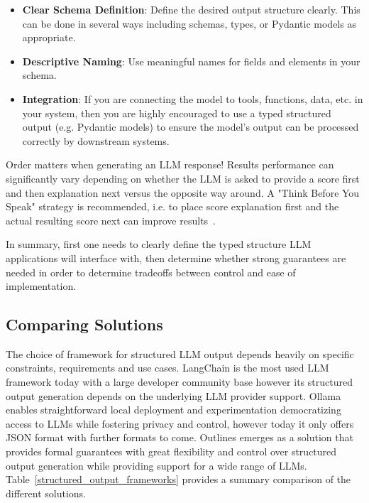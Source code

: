 \begin{itemize}
    \item \textbf{Clear Schema Definition}: Define the desired output structure clearly. This can be done in several ways including schemas, types, or Pydantic models as appropriate.
    
    \item \textbf{Descriptive Naming}: Use meaningful names for fields and elements in your schema.
    
    \item \textbf{Integration}: If you are connecting the model to tools, functions, data, etc. in your system, then you are highly encouraged to use a typed structured output (e.g. Pydantic models) to ensure the model's output can be processed correctly by downstream systems.
\end{itemize}

\begin{kaobox}[frametitle=Important]
Order matters when generating an LLM response! Results performance can significantly vary depending on whether the LLM is asked to provide a score first and then explanation next versus the opposite way around. A "Think Before You Speak" strategy is recommended, i.e. to place score explanation first and the actual resulting score next can improve results~.
\end{kaobox}

In summary, first one needs to clearly define the typed structure LLM applications will interface with, then determine whether strong guarantees are needed in order to determine tradeoffs between control and ease of implementation.

\subsection{Comparing Solutions}

The choice of framework for structured LLM output depends heavily on specific constraints, requirements and use cases. LangChain is the most used LLM framework today with a large developer community base however its structured output generation depends on the underlying LLM provider support. Ollama enables straightforward local deployment and experimentation democratizing access to LLMs while fostering privacy and control, however today it only offers JSON format with further formats to come. Outlines emerges as a solution that provides formal guarantees with great flexibility and control over structured output generation while providing support for a wide range of LLMs. Table~\ref{structured_output_frameworks} provides a summary comparison of the different solutions.

